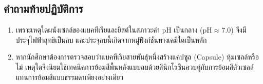 \subsection{คำถามท้ายปฏิบัติการ}
\begin{enumerate}
    \item เพราะเหตุใดผนังเซลล์ของแบคทีเรียและยีสต์ในสภาวะค่า $\text{pH}$ เป็นกลาง ($\text{pH} \approx 7.0$) จึงมีประจุไฟฟ้าสุทธิเป็นลบ และประจุลบนี้เกิดจากหมู่ฟังก์ชันทางเคมีใดเป็นหลัก
    \item หากนักศึกษาต้องการตรวจสอบว่าแบคทีเรียสายพันธุ์หนึ่งสร้างแคปซูล (Capsule) หุ้มเซลล์หรือไม่ เหตุใดจึงนิยมใช้เทคนิคการย้อมสีพื้นหลังแบบลบด้วยสีนิกโรซินควบคู่กับการย้อมสีตัวเซลล์ แทนการย้อมสีแบบธรรมดาเพียงอย่างเดียว
\end{enumerate}

